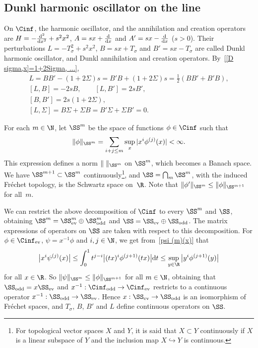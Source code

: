 \subsection{Dunkl harmonic oscillator on the line}\label{ss:L}

On $\Cinf$, the harmonic oscillator, and the annihilation and creation operators are $H=-\frac{{\rm d}^2}{{\rm d}x^2}+s^2x^2$, $A=sx+\frac{{\rm d}}{{\rm d}x}$ and $A'=sx-\frac{{\rm d}}{{\rm d}x}$ ($s>0$). Their perturbations $L=-T_\sigma^2+s^2x^2$, $B=sx+T_\sigma$ and $B'=sx-T_\sigma$ are called Dunkl harmonic oscillator, and Dunkl annihilation and creation operators. By~\eqref{[D sigma,x]=1+2Sigma, ...},
  \begin{gather}
    L=BB'-(1+2\Sigma)s=B'B+(1+2\Sigma)s=\frac{1}{2}(BB'+B'B) ,\label{L}\\
    [L,B]=-2sB ,\qquad[L,B']=2sB' ,\label{[L,B]}\\
    [B,B']=2s(1+2\Sigma) ,\label{[B,B']}\\
    [L,\Sigma]=B\Sigma+\Sigma B=B'\Sigma+\Sigma B'=0 .
    \label{[L,Sigma]=B' Sigma+Sigma B'=0}
  \end{gather}

For each $m\in\N$, let $\SS^m$ be the space of functions $\phi\in\Cinf$ such that
  \[
    \|\phi\|_{\SS^m}=\sum_{i+j\le m}\sup_x|x^i\phi^{(j)}(x)|<\infty .
  \]
This expression def\/ines a norm $\|\; \|_{\SS^m}$ on $\SS^m$, which becomes a Banach space. We have \mbox{$\SS^{m+1}\subset\SS^m$} continuously\footnote{For topological vector spaces $X$ and $Y$, it is said that $X\subset Y$ continuously if $X$ is a linear subspace of $Y$ and the inclusion map $X\hookrightarrow Y$ is continuous.}, and $\SS=\bigcap_m\SS^m$, with the induced Fr\'echet topology, is the Schwartz space on~$\R$. Note that $\|\phi'\|_{\SS^m}\le\|\phi\|_{\SS^{m+1}}$ for all~$m$.

We can restrict the above decomposition of $\Cinf$ to every $\SS^m$ and $\SS$,
obtaining $\SS^m=\SS^m_{\text{\rm ev}}\oplus\SS^m_{\text{\rm odd}}$ and $\SS=\SS_{\text{\rm ev}}\oplus\SS_{\text{\rm odd}}$. The matrix expressions of operators on $\SS$ are taken with respect to this decomposition. For $\phi\in \Cinf_{\text{\rm ev}}$, $\psi=x^{-1}\phi$ and $i,j\in\N$, we get from~\eqref{psi (m)(x)} that
  \[
    \big|x^i\psi^{(j)}(x)\big|\le\int_0^1t^{j-i}\big|(tx)^i\phi^{(j+1)}(tx)\big|{\rm d}t\le\sup_{y\in\R}\big|y^i\phi^{(j+1)}(y)\big|
  \]
for all $x\in\R$. So $\|\psi\|_{\SS^m}\le\|\phi\|_{\SS^{m+1}}$ for all $m\in\N$, obtaining that $\SS_{\text{\rm odd}}=x \SS_{\text{\rm ev}}$ and $x^{-1}:\Cinf_{\text{\rm odd}}\to \Cinf_{\text{\rm ev}}$ restricts to a continuous operator $x^{-1}:\SS_{\text{\rm odd}}\to\SS_{\text{\rm ev}}$. Hence $x:\SS_{\text{\rm ev}}\to\SS_{\text{\rm odd}}$ is an isomorphism of Fr\'echet spaces, and $T_\sigma$, $B$, $B'$ and $L$ def\/ine continuous operators on $\SS$.

